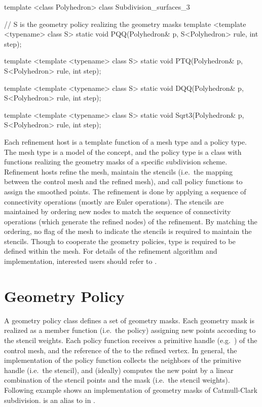 \begin{ccExampleCode}
template <class Polyhedron>
class Subdivision_surfaces_3 {
  // S is the geometry policy realizing the geometry masks
  template <template <typename> class S>
  static void PQQ(Polyhedron& p, S<Polyhedron> rule, int step);

  template <template <typename> class S>
  static void PTQ(Polyhedron& p, S<Polyhedron> rule, int step);

  template <template <typename> class S>
  static void DQQ(Polyhedron& p, S<Polyhedron> rule, int step);

  template <template <typename> class S>
  static void Sqrt3(Polyhedron& p, S<Polyhedron> rule, int step);
}
\end{ccExampleCode}


Each refinement host is a template function of
a mesh type and a policy type. The mesh type is
a model of the  concept, and the
policy type is a class with functions realizing the 
geometry masks of a specific subdivision scheme.
Refinement hosts refine the mesh, maintain the stencils 
(i.e.~the mapping between the control mesh and the refined mesh), 
and call policy functions to assign the smoothed points. 
The refinement is done by applying a sequence of connectivity 
operations (mostly are Euler operations).
The stencils are maintained by ordering new nodes to match the 
sequence of connectivity operations (which generate the refined nodes) 
of the refinement. By matching the ordering, no flag of the mesh
to indicate the stencils is required to maintain the stencils. 
Though to cooperate the geometry policies,  type is 
required to be defined within the mesh. For details of the 
refinement algorithm and implementation, interested users should 
refer to \cite{cgal:sp-mrbee-05} .

\section{Geometry Policy}
A geometry policy class defines a set of geometry masks. 
Each geometry mask is realized as a member function (i.e.~the policy) 
assigning new points according to the stencil weights.
Each policy function receives a primitive handle 
(e.g.~) of the control mesh, and the reference of 
the  to the refined vertex. In general, the implementation of 
the policy function collects the neighbors of the primitive 
handle (i.e.~the stencil), and (ideally) computes the new point 
by a linear combination of the stencil 
points and the mask (i.e.~the stencil weights).
Following example shows an implementation of geometry masks 
of Catmull-Clark subdivision.  is an alias to 
in .

